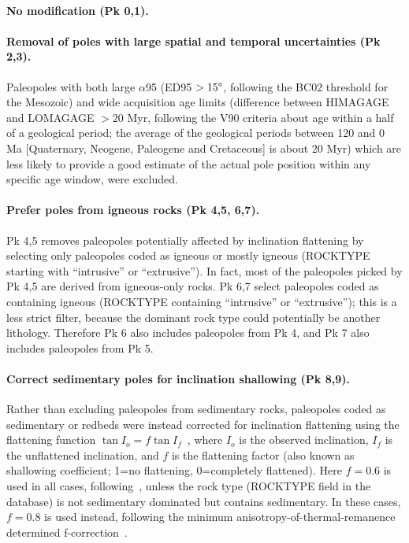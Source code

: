 \paragraph{No modification (Pk 0,1).}

\paragraph{Removal of poles with large spatial and temporal uncertainties
(Pk 2,3).} Paleopoles with both large $\alpha$95 (ED95 $>15\degree$,
following the BC02 threshold for the Mesozoic) and wide acquisition age limits
(difference between HIMAGAGE and LOMAGAGE $>20$ Myr, following the V90 criteria
about age within a half of a geological period; the average of the geological
periods between 120 and 0 Ma [Quaternary, Neogene, Paleogene and Cretaceous] is
about 20 Myr) which are less likely to provide a good estimate of the actual
pole position within any specific age window, were excluded.

\paragraph{Prefer poles from igneous rocks (Pk 4,5, 6,7).} Pk 4,5 removes
paleopoles potentially affected by inclination flattening by selecting only
paleopoles coded as igneous or mostly igneous (ROCKTYPE starting with
``intrusive'' or ``extrusive''). In fact, most of the paleopoles picked by Pk
4,5 are derived from igneous-only rocks. Pk 6,7 select paleopoles coded as
containing igneous (ROCKTYPE containing ``intrusive'' or ``extrusive''); this is
a less strict filter, because the dominant rock type could potentially be
another lithology. Therefore Pk 6 also includes paleopoles from Pk 4, and Pk 7
also includes paleopoles from Pk 5.

\paragraph{Correct sedimentary poles for inclination shallowing (Pk 8,9).}
Rather than excluding paleopoles from sedimentary rocks, paleopoles coded as
sedimentary or redbeds were instead corrected for inclination flattening using
the flattening function $\tan I_o = f \tan I_f$~\citep{K55}, where $I_o$ is the
observed inclination, $I_f$ is the unflattened inclination, and $f$ is the
flattening factor (also known as shallowing coefficient; 1=no flattening,
0=completely flattened). Here $f=0.6$ is used in all cases,
following~\citet{T12}, unless the rock type (ROCKTYPE field in the database) is
not sedimentary dominated but contains sedimentary. In these cases, $f=0.8$ is
used instead, following the minimum anisotropy-of-thermal-remanence determined
f-correction~\citep{D11,Do11}.

